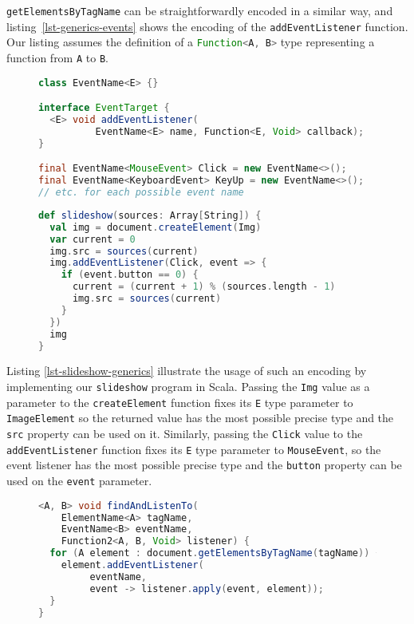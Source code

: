 \documentclass{llncs}
\newcommand{\jscode}[1]{\lstinline[language=JavaScript]|#1|}
\newcommand{\scalacode}[1]{\lstinline[language=Scala]|#1|}
\begin{document}
\scalacode{getElementsByTagName} can be straightforwardly encoded in a similar way, and listing~\ref{lst-generics-events} shows the encoding of the \jscode{addEventListener} function. Our listing assumes the definition of a \scalacode{Function<A, B>} type representing a function from \scalacode{A} to \scalacode{B}.

\begin{figure}
\begin{lstlisting}[label=lst-generics-events,language=java,caption={Encoding of the \jscode{addEventListener} function using type parameters}]
class EventName<E> {}

interface EventTarget {
  <E> void addEventListener(
          EventName<E> name, Function<E, Void> callback);
}

final EventName<MouseEvent> Click = new EventName<>();
final EventName<KeyboardEvent> KeyUp = new EventName<>();
// etc. for each possible event name
\end{lstlisting}
\end{figure}

\begin{figure}
\begin{lstlisting}[label=lst-slideshow-generics,language=Scala,caption={Scala implementation of the \texttt{slideshow} function using generics}]
def slideshow(sources: Array[String]) {
  val img = document.createElement(Img)
  var current = 0
  img.src = sources(current)
  img.addEventListener(Click, event => {
    if (event.button == 0) {
      current = (current + 1) % (sources.length - 1)
      img.src = sources(current)
    }
  })
  img
}
\end{lstlisting}
\end{figure}

Listing \ref{lst-slideshow-generics} illustrate the usage of such an encoding by implementing our \texttt{slideshow} program in Scala. Passing the \scalacode{Img} value as a parameter to the \scalacode{createElement} function fixes its \scalacode{E} type parameter to \scalacode{ImageElement} so the returned value has the most possible precise type and the \scalacode{src} property can be used on it. Similarly, passing the \scalacode{Click} value to the \scalacode{addEventListener} function fixes its \scalacode{E} type parameter to \scalacode{MouseEvent}, so the event listener has the most possible precise type and the \scalacode{button} property can be used on the \scalacode{event} parameter.

\begin{figure}
\begin{lstlisting}[label=lst-generics-comb,language=java,caption={Combination of \scalacode{getElementsByTagName} and \scalacode{addEventListener} functions encoded using type parameters}]
<A, B> void findAndListenTo(
    ElementName<A> tagName,
    EventName<B> eventName,
    Function2<A, B, Void> listener) {
  for (A element : document.getElementsByTagName(tagName)) {
    element.addEventListener(
         eventName,
         event -> listener.apply(event, element));
  }
}
\end{lstlisting}
\end{figure}
\end{document}
